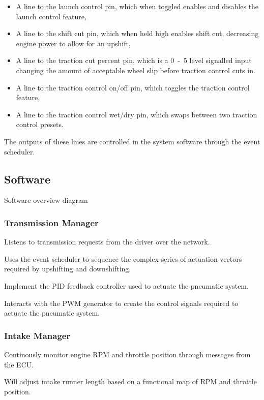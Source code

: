 \begin{itemize}
  \item A line to the launch control pin, which when toggled enables and disables the launch control feature,
  \item A line to the shift cut pin, which when held high enables shift cut, decreasing engine power to allow for an upshift,
  \item A line to the traction cut percent pin, which is a \unit{0-5}{\volt} level signalled input changing the amount of acceptable wheel slip before traction control cuts in.
  \item A line to the traction control on/off pin, which toggles the traction control feature,
  \item A line to the traction control wet/dry pin, which swaps between two traction control presets.
\end{itemize}

The outputs of these lines are controlled in the system software through the event scheduler. 

\subsection{Software}

Software overview diagram

\subsubsection{Transmission Manager}

Listens to transmission requests from the driver over the network.

Uses the event scheduler to sequence the complex series of actuation vectors required by upshifting and downshifting.

Implement the PID feedback controller used to actuate the pneumatic system.

Interacts with the PWM generator to create the control signals required to actuate the pneumatic system.


\subsubsection{Intake Manager}

Continously monitor engine RPM and throttle position through messages from the ECU.

Will adjust intake runner length based on a functional map of RPM and throttle position.

